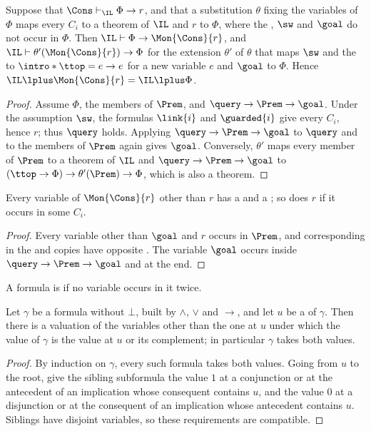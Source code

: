 \begin{lemma}\label{lem:F-equiv}
Suppose that $\Cons\vdash_{\IL}\Phi\to r$, and that a substitution $\theta$
fixing the variables of $\Phi$ maps every $C_i$ to a theorem of $\IL$ and
$r$ to $\Phi$, where the , $\sw$ and $\goal$ do not occur in
$\Phi$. Then $\IL\vdash\Phi\to\Mon{\Cons}{r}$, and
$\IL\vdash\theta'(\Mon{\Cons}{r})\to\Phi$ for the extension $\theta'$ of
$\theta$ that maps $\sw$ and the  to $\intro*\ttop=e\to e$ for a
new variable $e$ and $\goal$ to $\Phi$. Hence
$\IL\lplus\Mon{\Cons}{r}=\IL\lplus\Phi$.
\end{lemma}
\begin{proof}
Assume $\Phi$, the members of $\Prem$, and $\query\to\Prem\to\goal$.
Under the assumption $\sw$, the formulas $\link{i}$ and $\guarded{i}$ give
every $C_i$, hence $r$; thus $\query$ holds. Applying
$\query\to\Prem\to\goal$ to $\query$ and to the members of $\Prem$ again
gives $\goal$. Conversely, $\theta'$ maps every member of $\Prem$ to a
theorem of $\IL$ and $\query\to\Prem\to\goal$ to
$(\ttop\to\Phi)\to\theta'(\Prem)\to\Phi$, which is also a theorem.
\end{proof}

\begin{lemma}\label{lem:F-polar}
Every variable of $\Mon{\Cons}{r}$ other than $r$ has a  and a
 ; so does $r$ if it occurs in some $C_i$.
\end{lemma}
\begin{proof}
Every variable other than $\goal$ and $r$ occurs in $\Prem$, and
corresponding  in the  and  copies have
opposite . The variable $\goal$ occurs  inside
$\query\to\Prem\to\goal$ and  at the end.
\end{proof}

\AP A formula is  if no variable occurs in it twice.

\begin{lemma}\label{lem:readonce}
Let $\gamma$ be a  formula without $\bot$, built by
$\wedge$, $\vee$ and $\to$, and let $u$ be a  of $\gamma$. Then
there is a valuation of the variables other than the one at $u$ under which
the value of $\gamma$ is the value at $u$ or its complement; in particular
$\gamma$ takes both values.
\end{lemma}
\begin{proof}
By induction on $\gamma$, every such formula takes both values. Going from
$u$ to the root, give the sibling subformula the value $1$ at a conjunction
or at the antecedent of an implication whose consequent contains $u$, and
the value $0$ at a disjunction or at the consequent of an implication whose
antecedent contains $u$. Siblings have disjoint variables, so these
requirements are compatible.
\end{proof}

